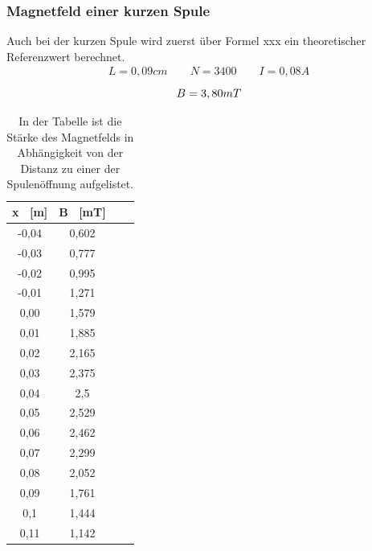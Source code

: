 \documentclass[titlepage = firstcover]{scrartcl}
\begin{document}
            \FloatBarrier
            \newpage


        \subsubsection{Magnetfeld einer kurzen Spule}
            Auch bei der kurzen Spule wird zuerst über Formel xxx ein theoretischer Referenzwert berechnet.
            \begin{align*}
                L = 0,09cm \qquad N = 3400 \qquad I = 0,08A 
            \end{align*}
            \begin{equation}
                B = 3,80 mT \\
                \label{eqn:Bkurz}
            \end{equation} 
            \begin{table}[h]
                \centering 
                \caption{In der Tabelle ist die Stärke des Magnetfelds in Abhängigkeit von der Distanz zu einer der Spulenöffnung aufgelistet.}
                \label{tab:Spulekurz}

                \begin{tabular}{c c c c}
                    \toprule
                    {x \ [m]} & {B \ [mT]} \\
                    \midrule
                    -0,04 & 0,602 \\
                    -0,03 & 0,777 \\
                    -0,02 & 0,995 \\
                    -0,01 & 1,271 \\
                     0,00 & 1,579 \\
                     0,01 & 1,885 \\
                     0,02 & 2,165 \\
                     0,03 & 2,375 \\
                     0,04 & 2,5   \\
                     0,05 & 2,529 \\
                     0,06 & 2,462 \\
                     0,07 & 2,299 \\
                     0,08 & 2,052 \\
                     0,09 & 1,761 \\
                     0,1  & 1,444 \\
                     0,11 & 1,142 \\
                    \bottomrule
                \end{tabular}                
            \end{table}
\end{document}
